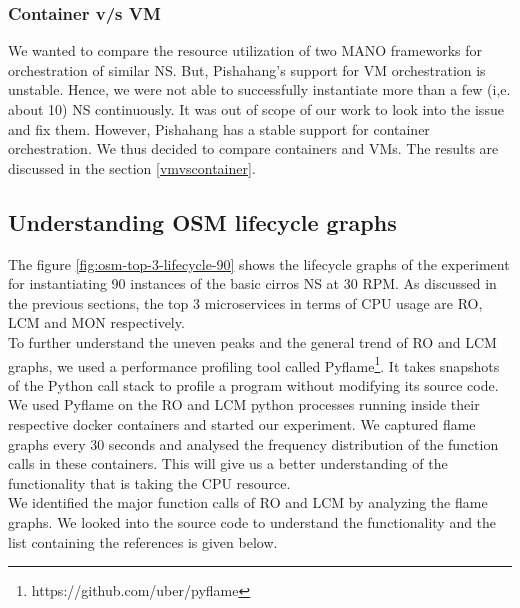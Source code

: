 \subsubsection{Container v/s VM}

We wanted to compare the resource utilization of two MANO frameworks for orchestration of similar NS. But, Pishahang's support for VM orchestration is unstable. Hence, we were not able to successfully instantiate more than a few (i,e. about 10) NS continuously. It was out of scope of our work to look into the issue and fix them. However, Pishahang has a stable support for container orchestration. We thus decided to compare containers and VMs. The results are discussed in the section \ref{vmvscontainer}.
	
\subsection{Understanding OSM lifecycle graphs}

The figure \ref{fig:osm-top-3-lifecycle-90} shows the lifecycle graphs of the experiment for instantiating 90 instances of the basic cirros NS at 30 RPM. As discussed in the previous sections, the top 3 microservices in terms of CPU usage are RO, LCM and MON respectively.\\

To further understand the uneven peaks and the general trend of RO and LCM graphs, we used a performance profiling tool called Pyflame\footnote{https://github.com/uber/pyflame}. It takes snapshots of the Python call stack to profile a program without modifying its source code. We used Pyflame on the RO and LCM python processes running inside their respective docker containers and started our experiment. We captured flame graphs every 30 seconds and analysed the frequency distribution of the function calls in these containers. This will give us a better understanding of the functionality that is taking the CPU resource. \\

We identified the major function calls of RO and LCM by analyzing the flame graphs. We looked into the source code to understand the functionality and the list containing the references is given below.

